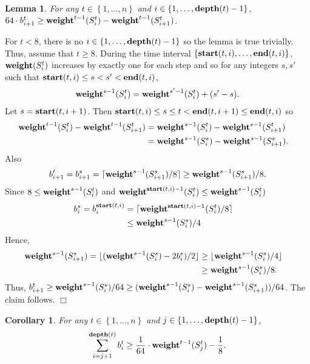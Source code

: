 \documentclass[11pt]{article}
\newtheorem{corollary}[theorem]{Corollary}
\newtheorem{lemma}[theorem]{Lemma}
\newcommand{\qed}{$\Box$}
\newenvironment{proof}{\noindent {\bf Proof:}}{\hfill \qed \smallskip}
\newcommand{\natInt}[2]{ \left\{ #1, \dotsc, #2 \right\} }
\newcommand{\weight}{{\rm {\bf weight}}}
\newcommand{\depth}{{\rm {\bf depth}}}
\newcommand{\starts}{{\rm {\bf start}}}
\newcommand{\sends}{{\rm {\bf end}}}
\begin{document}
\begin{lemma}\label{l-p1}
For any $t \in \natInt{1}{n}$ and $i \in \natInt{1}{\depth(t)-1}$, $64\cdot b^t_{i+1} \ge \weight^{t-1}(S^t_i) - \weight^{t-1}(S^t_{i+1})$.
\end{lemma}

\begin{proof} %
For $t<8$, there is no $i\in \natInt{1}{\depth(t)-1}$ so the lemma is true trivially. Thus, assume that $t\ge 8$.
During the time interval $\natInt{\starts(t,i)}{\sends(t,i)}$, $\weight(S^t_i)$ increases by exactly
one for each step and so for any integers $s,s'$ such that $\starts(t,i)\le s < s' < \sends(t,i)$,
\begin{align*}
\weight^{s-1}(S^t_i) = \weight^{s'-1}(S^t_i) + (s'-s).
\end{align*}
Let $s=\starts(t,i+1)$. Then $\starts(t,i) \le s \le t <  \sends(t,i+1) \le \sends(t,i)$ so
\begin{align*}
\weight^{t-1}(S^t_i) - \weight^{t-1}(S^t_{i+1}) &= \weight^{s-1}(S^t_i) - \weight^{s-1}(S^t_{i+1}) \cr
&= \weight^{s-1}(S^s_i) - \weight^{s-1}(S^s_{i+1}).
\end{align*}
Also
\begin{align*}
b^t_{i+1} = b^s_{i+1} = \lceil \weight^{s-1}(S^s_{i+1})/8\rceil \ge  \weight^{s-1}(S^s_{i+1})/8.
\end{align*}
Since $8 \le \weight^{s-1}(S^t_{i})$ and $\weight^{\starts(t,i)-1}(S^t_{i}) \le \weight^{s-1}(S^t_{i}) $
\begin{align*}
b^s_{i} = b^{\starts(t,i)}_{i} &= \lceil \weight^{\starts(t,i)-1}(S^t_{i})/8 \rceil \cr
&\le \weight^{s-1}(S^s_{i})/4
\end{align*}
Hence,
\begin{align*}
\weight^{s-1}(S^s_{i+1}) = \lfloor  (\weight^{s-1}(S^s_{i}) - 2b^s_i )/ 2 \rfloor &\ge \lfloor \weight^{s-1}(S^s_{i})/4 \rfloor \cr &\ge \weight^{s-1}(S^s_{i})/8.
\end{align*}
Thus, $b^t_{i+1} \ge \weight^{s-1}(S^s_{i})/64 \ge (\weight^{s-1}(S^s_i) - \weight^{s-1}(S^s_{i+1}))/64$. The claim follows.
\end{proof}



\begin{corollary}\label{c-weight}
For any $t \in \natInt{1}{n}$ and $j \in \natInt{1}{\depth(t)-1}$,$$\sum_{i=j+1}^{\depth(t)} b^t_{i} \ge 
\frac{1}{64} \cdot \weight^{t-1}(S^t_j) - \frac{1}{8}.$$
\end{corollary}
\end{document}

